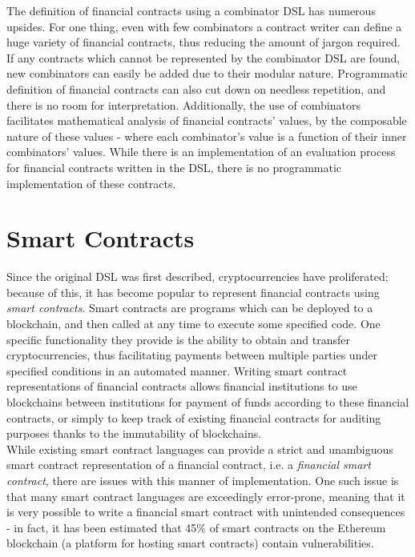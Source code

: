 The definition of financial contracts using a combinator DSL has numerous upsides. For one thing, even with few combinators a contract writer can define a huge variety of financial contracts, thus reducing the amount of jargon required. If any contracts which cannot be represented by the combinator DSL are found, new combinators can easily be added due to their modular nature. Programmatic definition of financial contracts can also cut down on needless repetition, and there is no room for interpretation. Additionally, the use of combinators facilitates mathematical analysis of financial contracts' values, by the composable nature of these values - where each combinator's value is a function of their inner combinators' values. While there is an implementation of an evaluation process for financial contracts written in the DSL, there is no programmatic implementation of these contracts.

\section{Smart Contracts}

Since the original DSL was first described, cryptocurrencies have proliferated; because of this, it has become popular to represent financial contracts using \textit{smart contracts}. Smart contracts are programs which can be deployed to a blockchain, and then called at any time to execute some specified code. One specific functionality they provide is the ability to obtain and transfer cryptocurrencies, thus facilitating payments between multiple parties under specified conditions in an automated manner\cite{Eth}. Writing smart contract representations of financial contracts allows financial institutions to use blockchains between institutions for payment of funds according to these financial contracts, or simply to keep track of existing financial contracts for auditing purposes thanks to the immutability of blockchains. \\

While existing smart contract languages can provide a strict and unambiguous smart contract representation of a financial contract, i.e. a \textit{financial smart contract}, there are issues with this manner of implementation. One such issue is that many smart contract languages are exceedingly error-prone, meaning that it is very possible to write a financial smart contract with unintended consequences - in fact, it has been estimated that 45\% of smart contracts on the Ethereum blockchain (a platform for hosting smart contracts) contain vulnerabilities\cite{EthSec}. \\

